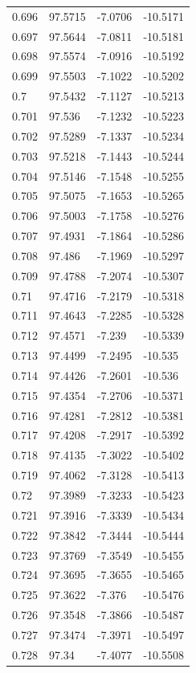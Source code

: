 \begin{tabular}{llll}
0.696 & 97.5715 & -7.0706 & -10.5171 \\
0.697 & 97.5644 & -7.0811 & -10.5181 \\
0.698 & 97.5574 & -7.0916 & -10.5192 \\
0.699 & 97.5503 & -7.1022 & -10.5202 \\
0.7 & 97.5432 & -7.1127 & -10.5213 \\
0.701 & 97.536 & -7.1232 & -10.5223 \\
0.702 & 97.5289 & -7.1337 & -10.5234 \\
0.703 & 97.5218 & -7.1443 & -10.5244 \\
0.704 & 97.5146 & -7.1548 & -10.5255 \\
0.705 & 97.5075 & -7.1653 & -10.5265 \\
0.706 & 97.5003 & -7.1758 & -10.5276 \\
0.707 & 97.4931 & -7.1864 & -10.5286 \\
0.708 & 97.486 & -7.1969 & -10.5297 \\
0.709 & 97.4788 & -7.2074 & -10.5307 \\
0.71 & 97.4716 & -7.2179 & -10.5318 \\
0.711 & 97.4643 & -7.2285 & -10.5328 \\
0.712 & 97.4571 & -7.239 & -10.5339 \\
0.713 & 97.4499 & -7.2495 & -10.535 \\
0.714 & 97.4426 & -7.2601 & -10.536 \\
0.715 & 97.4354 & -7.2706 & -10.5371 \\
0.716 & 97.4281 & -7.2812 & -10.5381 \\
0.717 & 97.4208 & -7.2917 & -10.5392 \\
0.718 & 97.4135 & -7.3022 & -10.5402 \\
0.719 & 97.4062 & -7.3128 & -10.5413 \\
0.72 & 97.3989 & -7.3233 & -10.5423 \\
0.721 & 97.3916 & -7.3339 & -10.5434 \\
0.722 & 97.3842 & -7.3444 & -10.5444 \\
0.723 & 97.3769 & -7.3549 & -10.5455 \\
0.724 & 97.3695 & -7.3655 & -10.5465 \\
0.725 & 97.3622 & -7.376 & -10.5476 \\
0.726 & 97.3548 & -7.3866 & -10.5487 \\
0.727 & 97.3474 & -7.3971 & -10.5497 \\
0.728 & 97.34 & -7.4077 & -10.5508 \\

\end{tabular}

